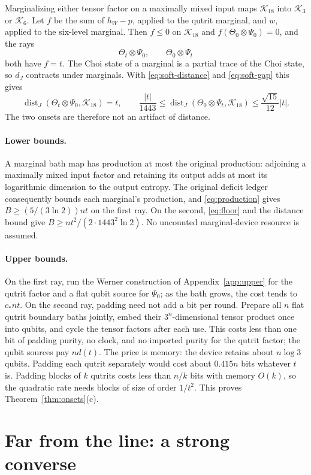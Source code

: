 \documentclass[11pt]{article}
\theoremstyle{definition}
\theoremstyle{remark}
\DeclareMathOperator{\dist}{dist}
\newcommand{\K}{\mathcal K}
\begin{document}
Marginalizing either tensor factor on a maximally mixed input maps $\K_{18}$ into $\K_3$ or $\K_6$. Let $f$ be the sum of $h_W-p$, applied to the qutrit marginal, and $w$, applied to the six-level marginal. Then $f\le0$ on $\K_{18}$ and $f(\Theta_0\otimes\Psi_0)=0$, and the rays
\[
 \Theta_t\otimes\Psi_0,\qquad \Theta_0\otimes\Psi_t
\]
both have $f=t$. The Choi state of a marginal is a partial trace of the Choi state, so $d_J$ contracts under marginals. With \eqref{eq:soft-distance} and \eqref{eq:soft-gap} this gives
\[
 \dist_J(\Theta_t\otimes\Psi_0,\K_{18})=t,\qquad
 \frac{|t|}{1443}\le\dist_J(\Theta_0\otimes\Psi_t,\K_{18})\le\frac{\sqrt{15}}{12}|t|.
\]
The two onsets are therefore not an artifact of distance.

\paragraph{Lower bounds.}
A marginal bath map has production at most the original production: adjoining a maximally mixed input factor and retaining its output adds at most its logarithmic dimension to the output entropy. The original deficit ledger consequently bounds each marginal's production, and \eqref{eq:production} gives $B\ge(5/(3\ln2))nt$ on the first ray. On the second, \eqref{eq:floor} and the distance bound give $B\ge nt^2/(2\cdot1443^2\ln2)$. No uncounted marginal-device resource is assumed.

\paragraph{Upper bounds.}
On the first ray, run the Werner construction of Appendix~\ref{app:upper} for the qutrit factor and a flat qubit source for $\Psi_0$; as the bath grows, the cost tends to $c_*nt$. On the second ray, padding need not add a bit per round. Prepare all $n$ flat qutrit boundary baths jointly, embed their $3^n$-dimensional tensor product once into qubits, and cycle the tensor factors after each use. This costs less than one bit of padding purity, no clock, and no imported purity for the qutrit factor; the qubit sources pay $nd(t)$. The price is memory: the device retains about $n\log3$ qubits. Padding each qutrit separately would cost about $0.415n$ bits whatever $t$ is. Padding blocks of $k$ qutrits costs less than $n/k$ bits with memory $O(k)$, so the quadratic rate needs blocks of size of order $1/t^2$. This proves Theorem~\ref{thm:onsets}(c).


\section{Far from the line: a strong converse}\label{sec:strong}
\end{document}
